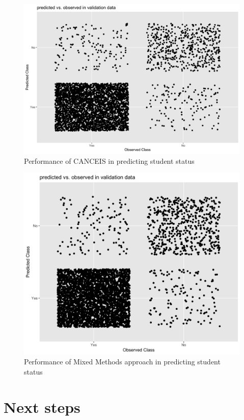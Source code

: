 \documentclass[]{book}
\begin{document}
\begin{figure}
\centering
\includegraphics{images/STCANCEISqplot.png}
\caption{Performance of CANCEIS in predicting student status}
\end{figure}

\begin{figure}
\centering
\includegraphics{images/STCANCEISXGqplot.png}
\caption{Performance of Mixed Methods approach in predicting student
status}
\end{figure}

\chapter{Next steps}\label{next-steps}
\end{document}
